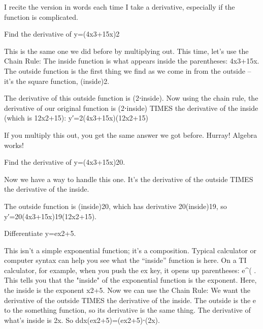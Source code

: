 I recite the version in words each time I take a derivative, especially if the function is complicated.

\begin{example}
Find the derivative of y=(4x3+15x)2
\begin{solution} This is the same one we did before by multiplying out. This time, let’s use the Chain Rule: The inside function is what appears inside the parentheses: 4x3+15x. The outside function is the first thing we find as we come in from the outside – it’s the square function, (inside)2.

The derivative of this outside function is (2⋅inside). Now using the chain rule, the derivative of our original function is (2⋅inside) TIMES the derivative of the inside (which is 12x2+15):
y′=2(4x3+15x)(12x2+15)
\end{solution}\end{example}

If you multiply this out, you get the same answer we got before. Hurray! Algebra works!

\begin{example}
Find the derivative of y=(4x3+15x)20.

\begin{solution} Now we have a way to handle this one. It’s the derivative of the outside TIMES the derivative of the inside.

The outside function is (inside)20, which has derivative 20(inside)19, so
y′=20(4x3+15x)19(12x2+15).
\end{solution}\end{example}

\begin{example}
Differentiate y=ex2+5.

\begin{solution} This isn’t a simple exponential function; it’s a composition. Typical calculator or computer syntax can help you see what the “inside” function is here. On a TI calculator, for example, when you push the ex key, it opens up parentheses: e^( . This tells you that the "inside" of the exponential function is the exponent. Here, the inside is the exponent x2+5. Now we can use the Chain Rule: We want the derivative of the outside TIMES the derivative of the inside. The outside is the e to the something function, so its derivative is the same thing. The derivative of what’s inside is 2x. So
ddx(ex2+5)=(ex2+5)⋅(2x).
\end{solution}\end{example}

